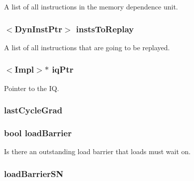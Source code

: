 \label{classMemDepUnit_a7f2828a4f877a4a4d4b85a6788536b82}
A list of all instructions in the memory dependence unit. \hypertarget{classMemDepUnit_a4c7e8849e2a4606478c2e93f9dcb6c54}{
\subsubsection[{instsToReplay}]{$<${\bf DynInstPtr}$>$ {\bf instsToReplay}}}
\label{classMemDepUnit_a4c7e8849e2a4606478c2e93f9dcb6c54}
A list of all instructions that are going to be replayed. \hypertarget{classMemDepUnit_ae1fd26993119273f381c42894e2672c6}{
\subsubsection[{iqPtr}]{$<$Impl$>$$\ast$ {\bf iqPtr}}}
\label{classMemDepUnit_ae1fd26993119273f381c42894e2672c6}
Pointer to the IQ. \hypertarget{classMemDepUnit_a5db9914f1c33ab7cef8fdc6037f98775}{
\subsubsection[{lastCycleGrad}]{ {\bf lastCycleGrad}}}
\label{classMemDepUnit_a5db9914f1c33ab7cef8fdc6037f98775}
\hypertarget{classMemDepUnit_a84cd010b1d5bb1d8a72a2603a9b58393}{
\subsubsection[{loadBarrier}]{\setlength{\rightskip}{0pt plus 5cm}bool {\bf loadBarrier}}}
\label{classMemDepUnit_a84cd010b1d5bb1d8a72a2603a9b58393}
Is there an outstanding load barrier that loads must wait on. \hypertarget{classMemDepUnit_adbdb10ce572ac89847d1541d471f0be6}{
\subsubsection[{loadBarrierSN}]{ {\bf loadBarrierSN}}}
